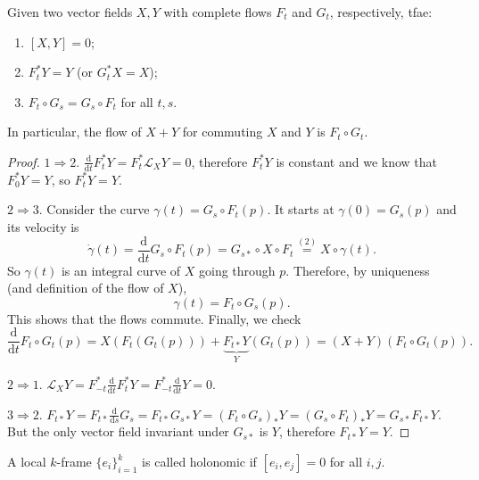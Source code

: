 \documentclass[english,letterpaper]{article}%
\numberwithin{equation}{section}
\numberwithin{figure}{section}
\numberwithin{table}{section}
\theoremstyle{definition}
\theoremstyle{definition}
\theoremstyle{definition}
\theoremstyle{plain}
\theoremstyle{plain}
\theoremstyle{plain}
\theoremstyle{plain}
\theoremstyle{remark}
\theoremstyle{remark}
\newcommand{\dd}{{\mathrm{d}}}
\newcommand{\Lie}{\mathcal{L}}
\begin{document}
\begin{prop}
    Given two vector fields $X,Y$ with complete flows $F_t$ and $G_t$, respectively, \gls{tfae}:
    \begin{enumerate}
        \item $[X,Y]=0$;
        \item $F^\ast_t Y=Y$ (or $G^\ast_t X=X$);
        \item $F_t\circ G_s=G_s\circ F_t$ for all $t,s$. 
    \end{enumerate}
    In particular, the flow of $X+Y$ for commuting $X$ and $Y$ is $F_t\circ G_t$.
\end{prop}
\begin{proof}
    $1\Rightarrow 2$. $\frac{\dd}{\dd t}F^\ast_t Y=F^\ast_t \Lie_X Y=0$, therefore $F^\ast_t Y$ is constant and we know that $F^\ast_0 Y=Y$, so $F^\ast_t Y=Y$.

    $2\Rightarrow 3$. Consider the curve $\gamma(t)=G_s\circ F_t(p)$. It starts at $\gamma(0)=G_s(p)$ and its velocity is
    \[\dot\gamma(t)=\frac{\dd}{\dd t} G_s\circ F_t(p)=G_{s\ast}\circ X\circ F_t\overset{(2)}{=}X\circ\gamma(t).\]
    So $\gamma(t)$ is an integral curve of $X$ going through $p$. Therefore, by uniqueness (and definition of the flow of $X$), 
    \[\gamma(t)=F_t\circ G_s(p).\]
    This shows that the flows commute. Finally, we check 
    \[\frac{\dd}{\dd t} F_t\circ G_t(p)=X(F_t(G_t(p)))+\underbrace{F_{t\ast }Y}_{Y}(G_t(p))=(X+Y)(F_t\circ G_t(p)).\]

    $2\Rightarrow 1$. $\Lie_X Y=F^\ast_{-t}\frac{\dd}{\dd t}F^\ast_t Y=F^\ast_{-t} \frac{\dd}{\dd t}Y=0$.

    $3\Rightarrow 2$. $F_{t\ast}Y=F_{t\ast}\frac{\dd}{\dd s}G_s=F_{t\ast} G_{s\ast} Y=(F_t\circ G_s)_\ast Y=(G_s\circ F_t)_\ast Y=G_{s\ast}F_{t\ast}Y$. But the only vector field invariant under $G_{s\ast}$ is $Y$, therefore $F_{t\ast}Y=Y$.
\end{proof}

\begin{defn}
    A local $k$-frame $\{e_i\}_{i=1}^k$ is called holonomic if $[e_i,e_j]=0$ for all $i,j$.
\end{defn}
\end{document}
